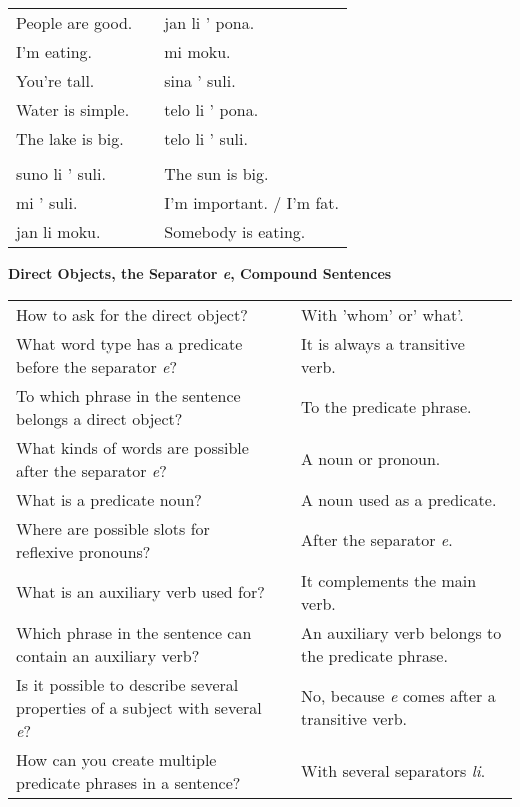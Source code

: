 \begin{supertabular}{p{5,5cm}|ll}
People are good. && jan li ' pona. \\ %
I'm eating. && mi moku. \\ %
You're tall. && sina ' suli. \\ %
Water is simple. && telo li ' pona. \\ %
The lake is big. && telo li ' suli. \\ %
 && \\ %
suno li ' suli. && The sun is big. \\
mi ' suli. && I'm important. / I'm fat. \\
jan li moku. && Somebody is eating. \\
\end{supertabular} 

\textbf{Direct Objects, the Separator \textit{e}, Compound Sentences} 
\label{'direct_objects_compund_sentences'}

\begin{supertabular}{p{5,5cm}|ll}
How to ask for the direct object? && With 'whom' or' what'. \\ %
What word type has a predicate before the separator \textit{e}?  && It is always a transitive verb. \\ %
To which phrase in the sentence belongs a direct object? && To the predicate phrase. \\ %
What kinds of words are possible after the separator \textit{e}?  && A noun or pronoun. \\ %
What is a predicate noun?  && A noun used as a predicate. \\ %
Where are possible slots for reflexive pronouns? && After the separator \textit{e}. \\ %
What is an auxiliary verb used for?  && It complements the main verb.  \\ %
Which phrase in the sentence can contain an auxiliary verb? && An auxiliary verb belongs to the predicate phrase.  \\ %
Is it possible to describe several properties of a subject with several \textit{e}? && No, because \textit{e} comes after a transitive verb. \\ %
How can you create multiple predicate phrases in a sentence?  && With several separators \textit{li}. \\ %
\end{supertabular} 

